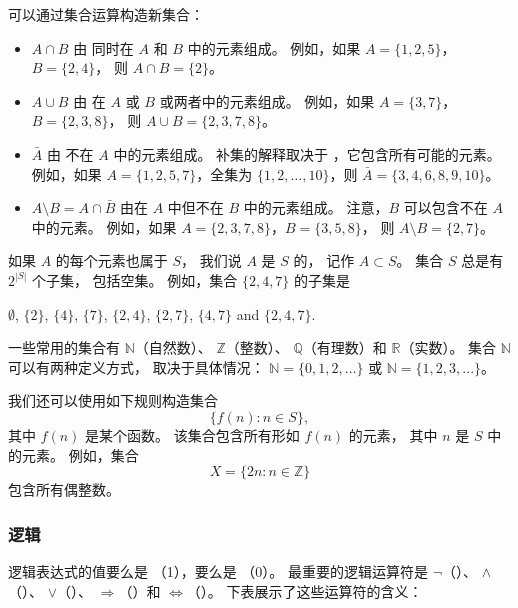 \begin{samepage}
可以通过集合运算构造新集合：
\begin{itemize}
\item {} $A \cap B$ 由
同时在 $A$ 和 $B$ 中的元素组成。
例如，如果 $A=\{1,2,5\}$，$B=\{2,4\}$，
则 $A \cap B = \{2\}$。
\item {} $A \cup B$ 由
在 $A$ 或 $B$ 或两者中的元素组成。
例如，如果 $A=\{3,7\}$，$B=\{2,3,8\}$，
则 $A \cup B = \{2,3,7,8\}$。
\item {} $\bar A$ 由
不在 $A$ 中的元素组成。
补集的解释取决于
，它包含所有可能的元素。
例如，如果 $A=\{1,2,5,7\}$，全集为
$\{1,2,\ldots,10\}$，则 $\bar A = \{3,4,6,8,9,10\}$。
\item {} $A \setminus B = A \cap \bar B$
由在 $A$ 中但不在 $B$ 中的元素组成。
注意，$B$ 可以包含不在 $A$ 中的元素。
例如，如果 $A=\{2,3,7,8\}$，$B=\{3,5,8\}$，
则 $A \setminus B = \{2,7\}$。
\end{itemize}
\end{samepage}

如果 $A$ 的每个元素也属于 $S$，
我们说 $A$ 是 $S$ 的，
记作 $A \subset S$。
集合 $S$ 总是有 $2^{|S|}$ 个子集，
包括空集。
例如，集合 $\{2,4,7\}$ 的子集是
\begin{center}
$\emptyset$,
$\{2\}$, $\{4\}$, $\{7\}$, $\{2,4\}$, $\{2,7\}$, $\{4,7\}$ and $\{2,4,7\}$.
\end{center}

一些常用的集合有
$\mathbb{N}$（自然数）、
$\mathbb{Z}$（整数）、
$\mathbb{Q}$（有理数）和
$\mathbb{R}$（实数）。
集合 $\mathbb{N}$
可以有两种定义方式，
取决于具体情况：
$\mathbb{N}=\{0,1,2,\ldots\}$
或 $\mathbb{N}=\{1,2,3,...\}$。

我们还可以使用如下规则构造集合
\[\{f(n) : n \in S\},\]
其中 $f(n)$ 是某个函数。
该集合包含所有形如 $f(n)$ 的元素，
其中 $n$ 是 $S$ 中的元素。
例如，集合
\[X=\{2n : n \in \mathbb{Z}\}\]
包含所有偶整数。

\subsubsection{逻辑}


逻辑表达式的值要么是
（1），要么是
（0）。
最重要的逻辑运算符是
$\lnot$（）、
$\land$（）、
$\lor$（）、
$\Rightarrow$（）和
$\Leftrightarrow$（）。
下表展示了这些运算符的含义：

